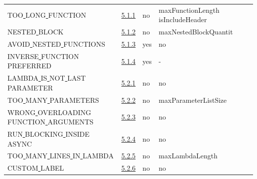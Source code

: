 \begin{longtable}{ |l|p{0.8cm}|p{0.8cm}| p{3cm} | }
TOO\underline{ }LONG\underline{ }FUNCTION & \hyperref[sec:5.1.1]{5.1.1} &  no  &  maxFunctionLength isIncludeHeader                                                                                                                                                                                          \\
NESTED\underline{ }BLOCK & \hyperref[sec:5.1.2]{5.1.2} &  no  &  maxNestedBlockQuantit                                                                                                                                                                                                      \\
AVOID\underline{ }NESTED\underline{ }FUNCTIONS & \hyperref[sec:5.1.3]{5.1.3} &  yes  &   no  \\
INVERSE\underline{ }FUNCTION\underline{ }PREFERRED & \hyperref[sec:5.1.4]{5.1.4} &  yes  &  - \\
LAMBDA\underline{ }IS\underline{ }NOT\underline{ }LAST\underline{ }PARAMETER & \hyperref[sec:5.2.1]{5.2.1} &  no  &  no                                                                                                                                                                                                                         \\
TOO\underline{ }MANY\underline{ }PARAMETERS & \hyperref[sec:5.2.2]{5.2.2} &  no  &  maxParameterListSize                                                                                                                                                                                                       \\
WRONG\underline{ }OVERLOADING\underline{ }FUNCTION\underline{ }ARGUMENTS & \hyperref[sec:5.2.3]{5.2.3} &  no  &  no                                                                                                                                                                                                                         \\
RUN\underline{ }BLOCKING\underline{ }INSIDE\underline{ }ASYNC & \hyperref[sec:5.2.4]{5.2.4} &  no  &   no \\
TOO\underline{ }MANY\underline{ }LINES\underline{ }IN\underline{ }LAMBDA & \hyperref[sec:5.2.5]{5.2.5} &  no  &  maxLambdaLength                                                                                                                                                                                                            \\
CUSTOM\underline{ }LABEL & \hyperref[sec:5.2.6]{5.2.6} &  no  &  no\\

\end{longtable}
